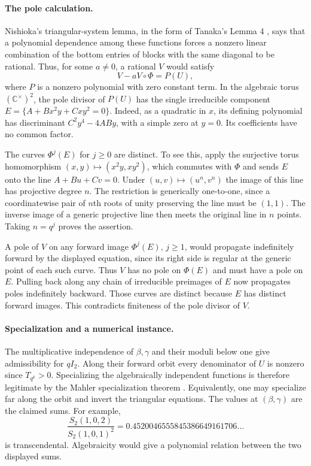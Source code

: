 \documentclass[11pt,a4paper]{article}
\theoremstyle{definition}
\theoremstyle{remark}
\numberwithin{equation}{section}
\begin{document}
\paragraph{The pole calculation.}
Nishioka's triangular-system lemma, in the form of Tanaka's Lemma 4 \cite{TanakaGeom}, says that a polynomial dependence among these functions forces a nonzero linear combination of the bottom entries of blocks with the same diagonal to be rational. Thus, for some $a\ne0$, a rational $V$ would satisfy
\[
 V-aV\circ\Phi=P(U),
\]
where $P$ is a nonzero polynomial with zero constant term. In the algebraic torus $(\mathbb C^\times)^2$, the pole divisor of $P(U)$ has the single irreducible component
$E=\{A+Bx^2y+Cxy^2=0\}$. Indeed, as a quadratic in $x$, its defining polynomial has discriminant $C^2y^4-4ABy$, with a simple zero at $y=0$. Its coefficients have no common factor.

The curves $\Phi^j(E)$ for $j\ge0$ are distinct. To see this, apply the surjective torus homomorphism $(x,y)\mapsto (x^2y,xy^2)$, which commutes with $\Phi$ and sends $E$ onto the line $A+Bu+Cv=0$. Under $(u,v)\mapsto(u^n,v^n)$ the image of this line has projective degree $n$. The restriction is generically one-to-one, since a coordinatewise pair of $n$th roots of unity preserving the line must be $(1,1)$. The inverse image of a generic projective line then meets the original line in $n$ points. Taking $n=q^j$ proves the assertion.

A pole of $V$ on any forward image $\Phi^j(E)$, $j\ge1$, would propagate indefinitely forward by the displayed equation, since its right side is regular at the generic point of each such curve. Thus $V$ has no pole on $\Phi(E)$ and must have a pole on $E$. Pulling back along any chain of irreducible preimages of $E$ now propagates poles indefinitely backward. Those curves are distinct because $E$ has distinct forward images. This contradicts finiteness of the pole divisor of $V$.

\paragraph{Specialization and a numerical instance.}
The multiplicative independence of $\beta,\gamma$ and their moduli below one give admissibility for $qI_2$. Along their forward orbit every denominator of $U$ is nonzero since $T_{q^k}>0$. Specializing the algebraically independent functions is therefore legitimate by the Mahler specialization theorem \cite[Cor.~3.5, Rem.~5.8 and Thm.~5.9]{AFfinite}. Equivalently, one may specialize far along the orbit and invert the triangular equations. The values at $(\beta,\gamma)$ are the claimed sums. For example,
\[
 \frac{S_2(1,0,2)}{S_2(1,0,1)^2}
     =0.4520046555845386649161706\ldots
\]
is transcendental. Algebraicity would give a polynomial relation between the two displayed sums.
\end{document}
